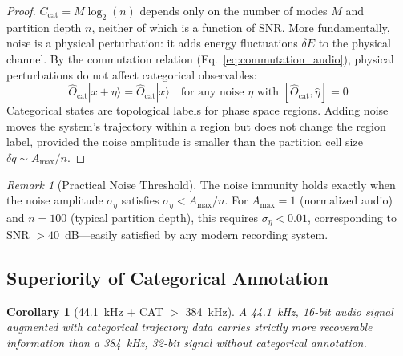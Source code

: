 \documentclass[twocolumn,10pt]{article}
\newtheorem{corollary}[theorem]{Corollary}
\theoremstyle{remark}
\newtheorem{remark}[theorem]{Remark}
\newcommand{\Ocat}{\hat{O}_{\mathrm{cat}}}
\newcommand{\Ccat}{C_{\mathrm{cat}}}
\begin{document}
\begin{proof}
$\Ccat = M \log_2(n)$ depends only on the number of modes $M$ and partition depth $n$, neither of which is a function of SNR. More fundamentally, noise is a physical perturbation: it adds energy fluctuations $\delta E$ to the physical channel. By the commutation relation (Eq.~\ref{eq:commutation_audio}), physical perturbations do not affect categorical observables:
\begin{equation}
    \Ocat |x + \eta\rangle = \Ocat |x\rangle \quad \text{for any noise } \eta \text{ with } [\Ocat, \hat{\eta}] = 0
\end{equation}
Categorical states are topological labels for phase space regions. Adding noise moves the system's trajectory within a region but does not change the region label, provided the noise amplitude is smaller than the partition cell size $\delta q \sim A_{\max}/n$.
\end{proof}

\begin{remark}[Practical Noise Threshold]
The noise immunity holds exactly when the noise amplitude $\sigma_\eta$ satisfies $\sigma_\eta < A_{\max}/n$. For $A_{\max} = 1$ (normalized audio) and $n = 100$ (typical partition depth), this requires $\sigma_\eta < 0.01$, corresponding to SNR $> 40$~dB---easily satisfied by any modern recording system.
\end{remark}

\subsection{Superiority of Categorical Annotation}

\begin{corollary}[44.1~kHz + CAT $>$ 384~kHz]
\label{cor:superiority}
A 44.1~kHz, 16-bit audio signal augmented with categorical trajectory data carries strictly more recoverable information than a 384~kHz, 32-bit signal without categorical annotation.
\end{corollary}
\end{document}
